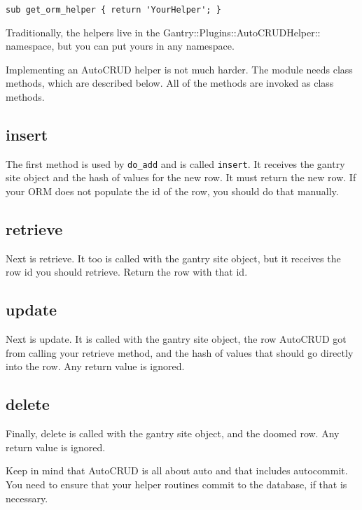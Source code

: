 \begin{verbatim}
sub get_orm_helper { return 'YourHelper'; }
\end{verbatim}

Traditionally, the helpers live in the Gantry::Plugins::AutoCRUDHelper::
namespace, but you can put yours in any namespace.

Implementing an AutoCRUD helper is not much harder.  The module needs
class methods, which are described below.  All of the methods are invoked
as class methods.

\subsection*{insert}

The first method is used by \verb+do_add+ and is called \verb+insert+.
It receives the gantry site object and the hash of values for the new
row.  It must return the new row.  If your ORM does not populate the
id of the row, you should do that manually.

\subsection*{retrieve}

Next is retrieve.  It too is called with the gantry site object, but
it receives the row id you should retrieve.  Return the row with that
id.

\subsection*{update}

Next is update.  It is called with the gantry site object, the row AutoCRUD
got from calling your retrieve method, and the hash of values that should
go directly into the row.  Any return value is ignored.

\subsection*{delete}

Finally, delete is called with the gantry site object, and the doomed row.
Any return value is ignored.

Keep in mind that AutoCRUD is all about auto and that includes autocommit.
You need to ensure that your helper routines commit to the database, if
that is necessary.

